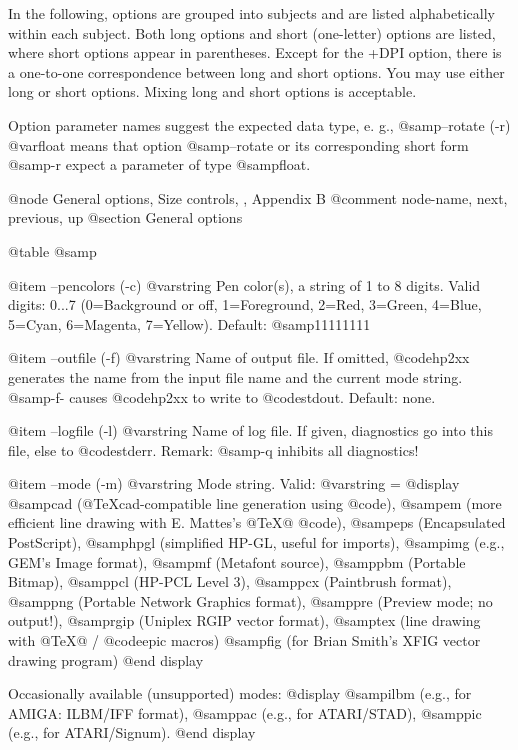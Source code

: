 In the following, options are grouped into subjects and
are listed alphabetically within each subject. Both long options and
short (one-letter) options are listed, where short options appear in
parentheses. Except for the +DPI option, there is a one-to-one correspondence
between long and short options. You may use either long or short options.
Mixing long and short options is acceptable.

Option parameter names suggest the expected data type, e. g.,
@samp{--rotate (-r) @var{float}} means that option @samp{--rotate} or its
corresponding short form @samp{-r} expect a parameter of type @samp{float}.

@node General options, Size controls, , Appendix B
@comment  node-name,  next,  previous,  up
@section General options

@table @samp

@item --pencolors (-c) @var{string}
Pen color(s), a string of 1 to 8 digits.
Valid digits: 0...7 (0=Background or off, 1=Foreground, 2=Red, 3=Green,
4=Blue, 5=Cyan, 6=Magenta, 7=Yellow). Default: @samp{11111111}

@item --outfile (-f) @var{string}
Name of output file. If omitted, @code{hp2xx} generates the name from
the input file name and the current mode string. @samp{-f-} causes
@code{hp2xx} to write to @code{stdout}. Default: none.

@item --logfile (-l) @var{string}
Name of log file. If given, diagnostics go into this file, else to
@code{stderr}. Remark: @samp{-q} inhibits all diagnostics!

@item --mode (-m) @var{string}
Mode string. Valid: @var{string} =
@display
  @samp{cad}  (@TeX{}cad-compatible line generation using @code{}),
  @samp{em}   (more efficient line drawing with E. Mattes's @TeX{}@ @code{}),
  @samp{eps}  (Encapsulated PostScript),
  @samp{hpgl} (simplified HP-GL, useful for imports),
  @samp{img}  (e.g., GEM's Image format),
  @samp{mf}   (Metafont source),
  @samp{pbm}  (Portable Bitmap),
  @samp{pcl}  (HP-PCL Level 3),
  @samp{pcx}  (Paintbrush format),
  @samp{png}  (Portable Network Graphics format),
  @samp{pre}  (Preview mode; no output!),
  @samp{rgip} (Uniplex RGIP vector format),
  @samp{tex}  (line drawing with @TeX{}@ / @code{epic} macros)
  @samp{fig}  (for Brian Smith's XFIG vector drawing program)
@end display

Occasionally available (unsupported) modes:
@display
  @samp{ilbm} (e.g., for AMIGA: ILBM/IFF format),
  @samp{pac}  (e.g., for ATARI/STAD),
  @samp{pic}  (e.g., for ATARI/Signum).
@end display

